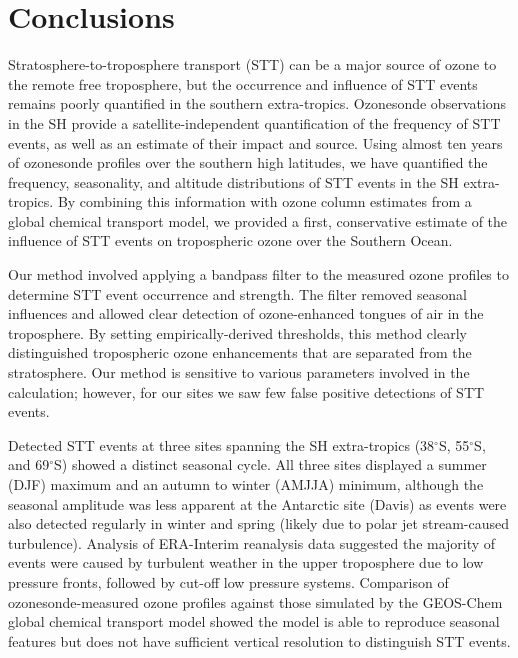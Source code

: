 \section{Conclusions}

  Stratosphere-to-troposphere transport (STT) can be a major source of ozone to the remote free troposphere, but the occurrence and influence of STT events remains poorly quantified in the southern extra-tropics.
  Ozonesonde observations in the SH provide a satellite-independent quantification of the frequency of STT events, as well as an estimate of their impact and source.
  Using almost ten years of ozonesonde profiles over the southern high latitudes, we have quantified the frequency, seasonality, and altitude distributions of STT events in the SH extra-tropics. 
  By combining this information with ozone column estimates from a global chemical transport model, we provided a first, conservative estimate of the influence of STT events on tropospheric ozone over the Southern Ocean.
  
  Our method involved applying a bandpass filter to the measured ozone profiles to determine STT event occurrence and strength.
  The filter removed seasonal influences and allowed clear detection of ozone-enhanced tongues of air in the troposphere.
  By setting empirically-derived thresholds, this method clearly distinguished tropospheric ozone enhancements that are separated from the stratosphere.
  Our method is sensitive to various parameters involved in the calculation; however, for our sites we saw few false positive detections of STT events.
  
  Detected STT events at three sites spanning the SH extra-tropics (38$^{\circ}$S, 55$^{\circ}$S, and 69$^{\circ}$S) showed a distinct seasonal cycle.
  All three sites displayed a summer (DJF) maximum and an autumn to winter (AMJJA) minimum, although the seasonal amplitude was less apparent at the Antarctic site (Davis) as events were also detected regularly in winter and spring (likely due to polar jet stream-caused turbulence).
  Analysis of ERA-Interim reanalysis data suggested the majority of events were caused by turbulent weather in the upper troposphere due to low pressure fronts, followed by cut-off low pressure systems.
  Comparison of ozonesonde-measured ozone profiles against those simulated by the GEOS-Chem global chemical transport model showed the model is able to reproduce seasonal features but does not have sufficient vertical resolution to distinguish STT events.
  
